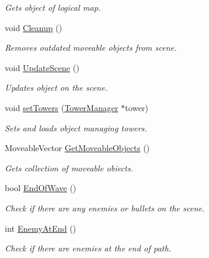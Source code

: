 \begin{DoxyCompactItemize}
\begin{DoxyCompactList}\small\item\em Gets object of logical map. \end{DoxyCompactList}\item 
\mbox{\label{class_scene_aa3add49578abdf4d3fd3fb47192d6e8e}} 
void \mbox{\hyperlink{class_scene_aa3add49578abdf4d3fd3fb47192d6e8e}{Cleanup}} ()
\begin{DoxyCompactList}\small\item\em Removes outdated moveable objects from scene. \end{DoxyCompactList}\item 
void \mbox{\hyperlink{class_scene_a0cd0a324b6fd0d560ce223e249be0828}{Update\+Scene}} ()
\begin{DoxyCompactList}\small\item\em Updates object on the scene. \end{DoxyCompactList}\item 
void \mbox{\hyperlink{class_scene_a9c715dfd2169aa537526947c6649b397}{set\+Towers}} (\mbox{\hyperlink{class_tower_manager}{Tower\+Manager}} $\ast$tower)
\begin{DoxyCompactList}\small\item\em Sets and loads object managing towers. \end{DoxyCompactList}\item 
Moveable\+Vector \mbox{\hyperlink{class_scene_a0e995515914c7ac027c8814f3bd341da}{Get\+Moveable\+Objects}} ()
\begin{DoxyCompactList}\small\item\em Gets collection of moveable obiects. \end{DoxyCompactList}\item 
bool \mbox{\hyperlink{class_scene_ad868aeb65543a3bd92b722b976885549}{End\+Of\+Wave}} ()
\begin{DoxyCompactList}\small\item\em Check if there are any enemies or bullets on the scene. \end{DoxyCompactList}\item 
int \mbox{\hyperlink{class_scene_a59c3ff8674ae5156614afe53d2797337}{Enemy\+At\+End}} ()
\begin{DoxyCompactList}\small\item\em Check if there are enemies at the end of path. \end{DoxyCompactList}\end{DoxyCompactItemize}


